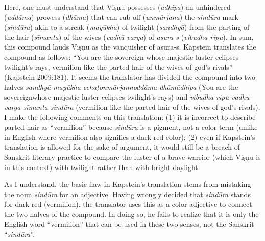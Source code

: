 Here, one must understand that Viṣṇu possesses (\textsl{adhipa}) an unhindered (\textsl{uddāma}) prowess (\textsl{dhāma}) that can rub off (\textsl{unmārjana}) the \textsl{sindūra} mark (\textsl{sindūra}) akin to a streak (\textsl{mayūkha}) of twilight (\textsl{sandhyā}) from the parting of the hair (\textsl{sīmanta}) of the wives (\textsl{vadhū-varga}) of \textsl{asura-s} (\textsl{vibudha-ripu}). In sum, this compound lauds Viṣṇu as the vanquisher of asura-s. Kapstein translates the compound as follows: “You are the sovereign whose majestic luster eclipses twilight’s rays, vermilion like the parted hair of the wives of god’s rivals” (Kapstein 2009:181). It seems the translator has divided the compound into two halves \textsl{sandhyā-mayūkha-cchaṭonmārjannoddāma-dhāmādhipa} (You are the sovereign\break whose majestic luster eclipses twilight’s rays) and \textsl{vibudha-ripu-vadhū-varga-sīmanta-sindūra} (vermilion like the parted hair of the wives of god’s rivals). I make the following comments on this translation: (1) it is incorrect to describe parted hair as “vermilion” because \textsl{sindūra} is a pigment, not a color term (unlike in English where vermilion also signifies a dark red color); (2) even if Kapstein’s translation is allowed for the sake of argument, it would still be a breach of Sanskrit literary practice to compare the luster of a brave warrior (which Viṣṇu is in this context) with twilight rather than with bright daylight. 

As I understand, the basic flaw in Kapstein’s translation stems from mistaking the noun \textsl{sindūra} for an adjective. Having wrongly decided that \textsl{sindūra} stands for dark red (vermilion), the translator uses this as a color adjective to connect the two halves of the compound. In doing so, he fails to realize that it is only the English word “vermilion” that can be used in these two senses, not the Sanskrit “\textsl{sindūra}”.

